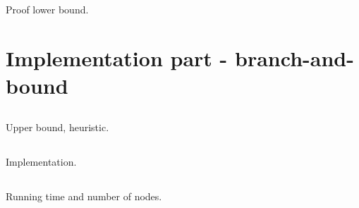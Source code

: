 \documentclass[11pt,a4paper,english]{article}
\begin{document}
\subsection{}
Proof lower bound.

\clearpage

\section{Implementation part - branch-and-bound}

\subsection{}
Upper bound, heuristic.

\subsection{}
Implementation.

\subsection{}
Running time and number of nodes.
\end{document}
